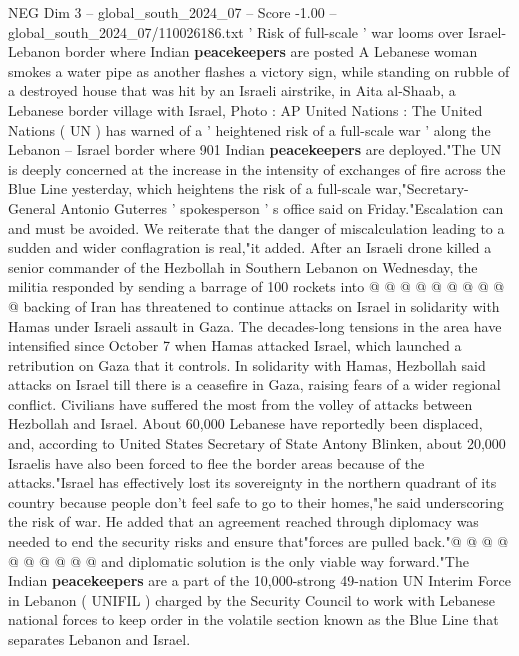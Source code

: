 \begin{textsample}{NEG Dim 3 – global\_south\_2024\_07 – Score -1.00 – global\_south\_2024\_07/110026186.txt}  \label{ex:f3_neg_141}
' Risk of full-scale ' war looms over Israel-Lebanon border where Indian \textbf{peacekeepers} are posted A Lebanese woman smokes a water pipe as another flashes a victory sign, while standing on rubble of a destroyed house that was hit by an Israeli airstrike, in Aita al-Shaab, a Lebanese border village with Israel, Photo : AP United Nations : The United Nations ( UN ) has warned of a ' heightened risk of a full-scale war ' along the Lebanon -- Israel border where 901 Indian \textbf{peacekeepers} are deployed."The UN is deeply concerned at the increase in the intensity of exchanges of fire across the Blue Line yesterday, which heightens the risk of a full-scale war,"Secretary-General Antonio Guterres ' spokesperson ' s office said on Friday."Escalation can and must be avoided.
We reiterate that the danger of miscalculation leading to a sudden and wider conflagration is real,"it added.
After an Israeli drone killed a senior commander of the Hezbollah in Southern Lebanon on Wednesday, the militia responded by sending a barrage of 100 rockets into @ @ @ @ @ @ @ @ @ @ backing of Iran has threatened to continue attacks on Israel in solidarity with Hamas under Israeli assault in Gaza.
The decades-long tensions in the area have intensified since October 7 when Hamas attacked Israel, which launched a retribution on Gaza that it controls.
In solidarity with Hamas, Hezbollah said attacks on Israel till there is a ceasefire in Gaza, raising fears of a wider regional conflict.
Civilians have suffered the most from the volley of attacks between Hezbollah and Israel.
About 60,000 Lebanese have reportedly been displaced, and, according to United States Secretary of State Antony Blinken, about 20,000 Israelis have also been forced to flee the border areas because of the attacks."Israel has effectively lost its sovereignty in the northern quadrant of its country because people don't feel safe to go to their homes,"he said underscoring the risk of war.
He added that an agreement reached through diplomacy was needed to end the security risks and ensure that"forces are pulled back."@ @ @ @ @ @ @ @ @ @ and diplomatic solution is the only viable way forward."The Indian \textbf{peacekeepers} are a part of the 10,000-strong 49-nation UN Interim Force in Lebanon ( UNIFIL ) charged by the Security Council to work with Lebanese national forces to keep order in the volatile section known as the Blue Line that separates Lebanon and Israel.

\end{textsample}
